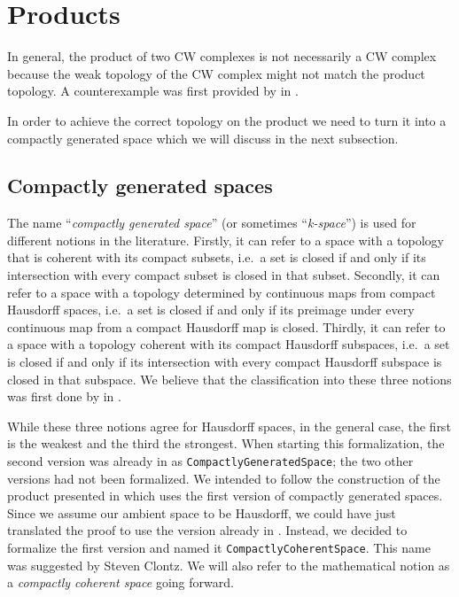 \section{Products}\label{sec:products}

In general, the product of two CW complexes is not necessarily a CW complex because the weak topology of the CW complex might not match the product topology.
A counterexample was first provided by \citeauthor{Dowker1952} in \cite{Dowker1952}.

In order to achieve the correct topology on the product we need to turn it into a compactly generated space which we will discuss in the next subsection.

\subsection{Compactly generated spaces}

The name ``\emph{compactly generated space}'' (or sometimes ``\emph{k-space}'') is used for different notions in the literature.
Firstly, it can refer to a space with a topology that is coherent with its compact subsets, i.e.\ a set is closed if and only if its intersection with every compact subset is closed in that subset. 
Secondly, it can refer to a space with a topology determined by continuous maps from compact Hausdorff spaces, i.e.\ a set is closed if and only if its preimage under every continuous map from a compact Hausdorff map is closed. 
Thirdly, it can refer to a space with a topology coherent with its compact Hausdorff subspaces, i.e.\ a set is closed if and only if its intersection with every compact Hausdorff subspace is closed in that subspace. 
We believe that the classification into these three notions was first done by \citeauthor{Wikipedia2025} in \cite{Wikipedia2025}.

While these three notions agree for Hausdorff spaces, in the general case, the first is the weakest and the third the strongest. 
When starting this formalization, the second version was already in \mathlib as \lstinline|CompactlyGeneratedSpace|; the two other versions had not been formalized. 
We intended to follow the construction of the product presented in \cite{Hatcher2002} which uses the first version of compactly generated spaces. 
Since we assume our ambient space to be Hausdorff, we could have just translated the proof to use the version already in \mathlib. 
Instead, we decided to formalize the first version and named it \lstinline|CompactlyCoherentSpace|.
This name was suggested by Steven Clontz. 
We will also refer to the mathematical notion as a \emph{compactly coherent space} going forward.

